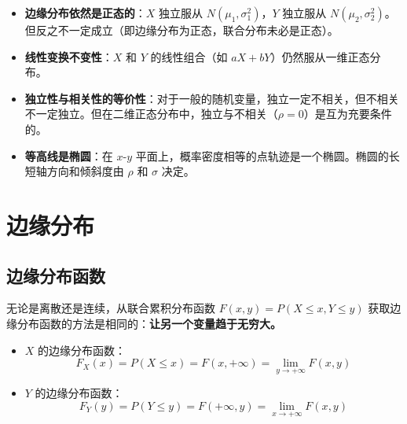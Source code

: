 \begin{property}[二维正态分布的重要性质]
\begin{itemize}
	\item \textbf{边缘分布依然是正态的}：$X$ 独立服从 $N(\mu_1, \sigma_1^2)$，$Y$ 独立服从 $N(\mu_2, \sigma_2^2)$。但反之不一定成立（即边缘分布为正态，联合分布未必是正态）。
	\item \textbf{线性变换不变性}：$X$ 和 $Y$ 的线性组合（如 $aX + bY$）仍然服从一维正态分布。
	\item \textbf{独立性与相关性的等价性}：对于一般的随机变量，独立一定不相关，但不相关不一定独立。但在二维正态分布中，独立与不相关（$\rho = 0$）是互为充要条件的。
	\item \textbf{等高线是椭圆}：在 $x$-$y$ 平面上，概率密度相等的点轨迹是一个椭圆。椭圆的长短轴方向和倾斜度由 $\rho$ 和 $\sigma$ 决定。
\end{itemize}
\end{property}

\section{边缘分布}
\subsection{边缘分布函数}
\begin{definition}[边缘分布函数]
无论是离散还是连续，从联合累积分布函数 $F(x, y) = P(X \le x, Y \le y)$ 获取边缘分布函数的方法是相同的：\textbf{让另一个变量趋于无穷大。}
\begin{itemize}
	\item $X$ 的边缘分布函数：
	\begin{equation}
		F_X(x) = P(X \le x) = F(x, +\infty) = \lim_{y \to +\infty} F(x, y)
		\label{eq:第三章:X边缘分布函数}
	\end{equation}
	\item $Y$ 的边缘分布函数：
	\begin{equation}
		F_Y(y) = P(Y \le y) = F(+\infty, y) = \lim_{x \to +\infty} F(x, y)
		\label{eq:第三章:Y边缘分布函数}
	\end{equation}
\end{itemize}
\end{definition}

